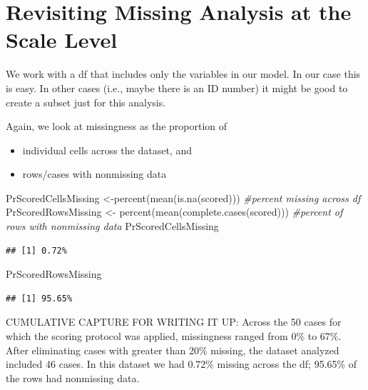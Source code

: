 \documentclass[
  11pt,
]{book}
\newenvironment{Shaded}{\begin{snugshade}}{\end{snugshade}}
\newcommand{\CommentTok}[1]{\textcolor[rgb]{0.56,0.35,0.01}{\textit{#1}}}
\newcommand{\FunctionTok}[1]{\textcolor[rgb]{0.00,0.00,0.00}{#1}}
\newcommand{\NormalTok}[1]{#1}
\newcommand{\OtherTok}[1]{\textcolor[rgb]{0.56,0.35,0.01}{#1}}
\providecommand{\tightlist}{%
  \setlength{\itemsep}{0pt}\setlength{\parskip}{0pt}}
\begin{document}
\hypertarget{revisiting-missing-analysis-at-the-scale-level}{%
\section{Revisiting Missing Analysis at the Scale Level}\label{revisiting-missing-analysis-at-the-scale-level}}

We work with a df that includes only the variables in our model. In our case this is easy. In other cases (i.e., maybe there is an ID number) it might be good to create a subset just for this analysis.

Again, we look at missingness as the proportion of

\begin{itemize}
\tightlist
\item
  individual cells across the dataset, and
\item
  rows/cases with nonmissing data
\end{itemize}

\begin{Shaded}
\begin{Highlighting}[]
\NormalTok{PrScoredCellsMissing }\OtherTok{\textless{}{-}}\FunctionTok{percent}\NormalTok{(}\FunctionTok{mean}\NormalTok{(}\FunctionTok{is.na}\NormalTok{(scored))) }\CommentTok{\#percent missing across df}
\NormalTok{PrScoredRowsMissing }\OtherTok{\textless{}{-}} \FunctionTok{percent}\NormalTok{(}\FunctionTok{mean}\NormalTok{(}\FunctionTok{complete.cases}\NormalTok{(scored))) }\CommentTok{\#percent of rows with nonmissing data}
\NormalTok{PrScoredCellsMissing}
\end{Highlighting}
\end{Shaded}

\begin{verbatim}
## [1] 0.72%
\end{verbatim}

\begin{Shaded}
\begin{Highlighting}[]
\NormalTok{PrScoredRowsMissing}
\end{Highlighting}
\end{Shaded}

\begin{verbatim}
## [1] 95.65%
\end{verbatim}

CUMULATIVE CAPTURE FOR WRITING IT UP: Across the 50 cases for which the scoring protocol was applied, missingness ranged from 0\% to 67\%. After eliminating cases with greater than 20\% missing, the dataset analyzed included 46 cases. In this dataset we had 0.72\% missing across the df; 95.65\% of the rows had nonmissing data.
\end{document}
